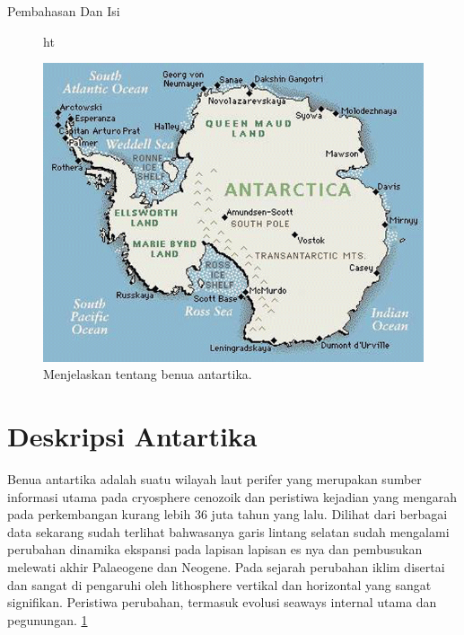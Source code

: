 

																		
Pembahasan Dan Isi 

\begin{figure}{ht}
\centerline{\includegraphics[width=1\textwidth]{figures/antartic.PNG}}
\caption{Menjelaskan tentang benua antartika.}
\label{Antartika}
\end{figure}

\section{Deskripsi Antartika}



		Benua antartika adalah suatu wilayah laut perifer yang merupakan sumber informasi utama pada cryosphere cenozoik dan peristiwa 
	kejadian yang mengarah pada perkembangan kurang lebih 36 juta tahun yang lalu. Dilihat dari berbagai data sekarang sudah terlihat bahwasanya 
	garis lintang selatan sudah mengalami perubahan dinamika ekspansi pada lapisan lapisan es nya dan pembusukan melewati akhir Palaeogene dan Neogene. 
	Pada sejarah perubahan iklim disertai dan sangat di pengaruhi oleh lithosphere vertikal dan horizontal yang sangat signifikan. Peristiwa perubahan, 
	termasuk evolusi seaways internal utama dan pegunungan. \ref{Antartika}
		
